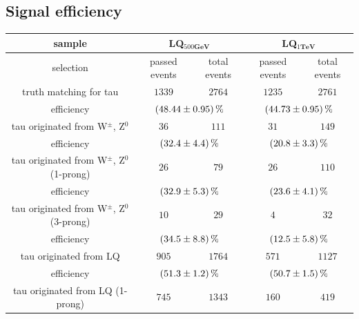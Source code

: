 \subsection{Signal efficiency}
%	
	\begin{table}
		\centering
                \footnotesize
                \renewcommand{\arraystretch}{1.2}
		\begin{tabular*}{\linewidth}{@{\extracolsep{\fill}}ccccc}
		\hline
		\hline
		 \textbf{sample}  & \multicolumn{2}{c}{\textbf{LQ$_{500\textbf{GeV}}$}}  & \multicolumn{2}{c}{\textbf{LQ$_{1\textbf{TeV}}$}} 
		\\
		\hline
		selection  & passed events      & total events & passed events      & total events
		\\ 
		\hline
		truth matching for tau      & $1339$            & $2764$      & $1235$        & $2761$
		\\
		efficiency                  & \multicolumn{2}{c}{$\SI{48.44\pm 0.95}{\percent}$}    & \multicolumn{2}{c}{$\SI{44.73\pm 0.95}{\percent}$}
		\\
		\hline
		tau originated from W$^{\pm}$, Z$^0$& $36$        & $111$         & $31$          & $149$
		\\
		efficiency                  & \multicolumn{2}{c}{$\SI{32.4\pm 4.4}{\percent}$}   & \multicolumn{2}{c}{$\SI{20.8\pm 3.3}{\percent}$}
		\\
		\hline
                tau originated from W$^{\pm}$, Z$^0$ (1-prong)& $26$        & $79$         & $26$          & $110$
		\\
		efficiency                  & \multicolumn{2}{c}{$\SI{32.9\pm 5.3}{\percent}$}   & \multicolumn{2}{c}{$\SI{23.6\pm 4.1}{\percent}$}
		\\
		\hline
                tau originated from W$^{\pm}$, Z$^0$ (3-prong)& $10$        & $29$         & $4$          & $32$
		\\
		efficiency                  & \multicolumn{2}{c}{$\SI{34.5\pm 8.8}{\percent}$}   & \multicolumn{2}{c}{$\SI{12.5\pm 5.8}{\percent}$}
		\\
		\hline
                tau originated from LQ& $905$        & $1764$         & $571$          & $1127$
		\\
		efficiency                  & \multicolumn{2}{c}{$\SI{51.3\pm 1.2}{\percent}$}   & \multicolumn{2}{c}{$\SI{50.7\pm 1.5}{\percent}$}
		\\
		\hline
                tau originated from LQ (1-prong)& $745$        & $1343$         & $160$          & $419$
		\\

\end{tabular*}
\end{table}
